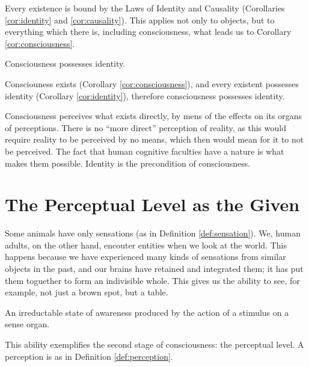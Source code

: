         Every existence is bound by the Laws of Identity and Causality (Corollaries \ref{cor:identity} and \ref{cor:causality}). This applies not only to objects, but to everything which there is, including consciousness, what leads us to Corollary \ref{cor:consciousness}.
        
            \begin{corollary}
            \label{cor:consciousness}
                Consciousness possesses identity.
            \end{corollary}

            \begin{remark}
                Consciouness exists (Corollary \ref{cor:consciousness}), and every existent possesses identity (Corollary \ref{cor:identity}), therefore consciousness possesses identity.
            \end{remark}
        
        Consciousness perceives what exists directly, by mens of the effects on its organs of perceptions. There is no ``more direct'' perception of reality, as this would require reality to be perceived by no means, which then would mean for it to not be perceived. The fact that human cognitive faculties have a nature is what makes them possible. Identity is the precondition of consciousness.

    \section{The Perceptual Level as the Given}

        Some animals have only sensations (as in Definition \ref{def:sensation}). We, human adults, on the other hand, encouter entities when we look at the world. This happens because we have experienced many kinds of sensations from similar objects in the past, and our brains have retained and integrated them; it has put them toguether to form an indivisible whole. This gives us the ability to see, for example, not just a brown spot, but a table.
            
            \begin{definition}[Sensation]
            \label{def:sensation}
                An irreductable state of awareness produced by the action of a stimulus on a sense organ.
            \end{definition}

        This ability exemplifies the second stage of consciousness: the perceptual level. A perception is as in Definition \ref{def:perception}.

